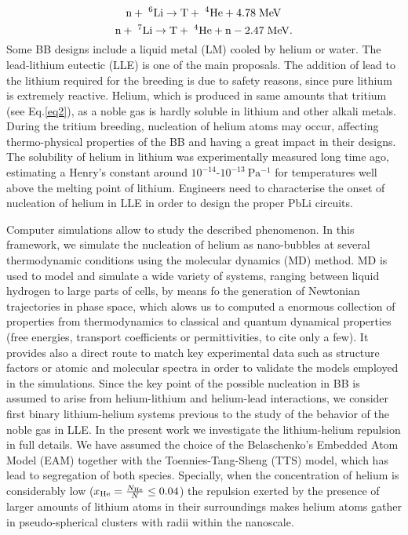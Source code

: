 \documentclass[jcp,amsmath,amssymb,preprint]{revtex4-1}
\begin{document}
\begin{equation} 
        {\rm n} + \;^{6}{\rm Li} \rightarrow  {\rm T} + \;^{4}{\rm He} +  4.78\;{\rm MeV}
    \label{eq1}
    \end{equation}
    \begin{equation} 
        {\rm n} + \;^{7}{\rm Li} \rightarrow  {\rm T} + \;^{4}{\rm He} 
        + {\rm n} -  2.47\;{\rm MeV}.
    \label{eq2}
\end{equation}
Some BB designs include a liquid metal (LM) cooled by helium or water. The lead-lithium eutectic (LLE) is one of the main proposals. The addition of lead to the lithium required for the breeding is due to safety reasons, since pure lithium is extremely reactive.  Helium, which is produced in same amounts that tritium (see Eq.\ref{eq2}), as a noble gas is hardly soluble in lithium and other alkali metals. During the tritium breeding, nucleation of helium atoms may occur, affecting thermo-physical properties of the BB and having a great impact in their designs. The solubility of helium in lithium was experimentally measured long time ago, estimating a Henry's constant around $10^{-14}$-$10^{-13}\SI{}{\pascal^{-1}}$ for temperatures well above the melting point of lithium\cite{slotnick1965solubility}. Engineers need to characterise the onset of nucleation of helium in LLE in order to design the proper PbLi circuits.  

Computer simulations allow to study the described phenomenon. In this framework, we simulate the nucleation of helium as nano-bubbles at several thermodynamic conditions using the molecular dynamics (MD) method.  MD is used to model and simulate a wide variety of systems, ranging between liquid hydrogen to large parts of cells, by means fo the generation of Newtonian trajectories in phase space,  which alows us to computed a enormous collection of properties from thermodynamics to classical and quantum dynamical properties (free energies,  transport coefficients or permittivities, to cite only a few\cite{padro1994molecular, calero20151h}). It provides also a direct route to match key experimental data such as structure factors or atomic and molecular spectra\cite{brunger1987crystallographic,padro2004response} in order to validate the models employed in the simulations. Since the key point of the possible nucleation in BB is assumed to arise from helium-lithium and helium-lead interactions, we consider first binary lithium-helium systems previous to the study of the behavior of the noble gas in LLE. In the present work we investigate the lithium-helium repulsion in full details.  We have assumed the choice of the Belaschenko's Embedded Atom Model (EAM)\cite{belashchenko2012embedded} together with the Toennies-Tang-Sheng (TTS) model\cite{sheng2020conformal,sheng2021development}, which has lead to segregation of both species. Specially, when the concentration of helium is considerably low ($x_{\rm He}=\frac{N_{\rm He}}{N}\leq 0.04$) the repulsion exerted by the presence of larger amounts of lithium atoms in their surroundings makes helium atoms gather in pseudo-spherical clusters with radii within the nanoscale.
\end{document}
